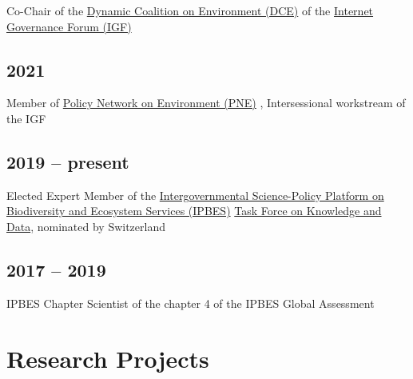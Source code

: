 \documentclass[a4paper]{article}
\begin{document}
Co-Chair of the \href{https://intgovforum.org/en/content/dynamic-coalition-on-environment-dce}{Dynamic Coalition on Environment (DCE)} of the \href{https://intgovforum.org/en}{Internet Governance Forum (IGF)}

\subsection{2021}

Member of \href{https://www.intgovforum.org/en/content/policy-network-on-environment-pne}{Policy Network on Environment (PNE)} , Intersessional workstream of the IGF

\subsection{2019 -- present}

Elected Expert Member of the \href{https://ipbes.net/}{Intergovernmental Science-Policy Platform on Biodiversity and Ecosystem Services (IPBES)} \href{https://ipbes.net/knowledge-data}{Task Force on Knowledge and Data}, nominated by Switzerland

\subsection{2017 -- 2019}

IPBES Chapter Scientist of the chapter 4 of the IPBES Global Assessment



\section{Research Projects}
\end{document}
